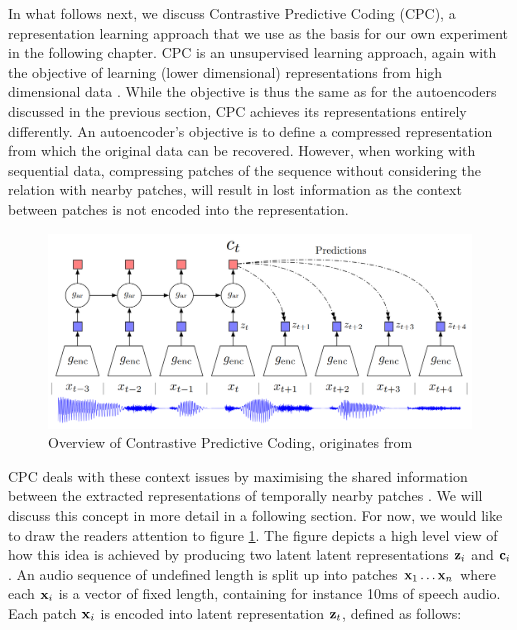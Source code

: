 	In what follows next, we discuss Contrastive Predictive Coding (CPC), a representation learning approach that we use as the basis for our own experiment in the following chapter.
	CPC is an unsupervised learning approach, again with the objective of learning (lower dimensional) representations from high dimensional data \cite{oordRepresentationLearningContrastive2019}. While the objective is thus the same as for the autoencoders discussed in the previous section, CPC achieves its representations entirely differently. An autoencoder's objective is to define a compressed representation from which the original data can be recovered. However, when working with sequential data, compressing patches of the sequence without considering the relation with nearby patches, will result in lost information as the context between patches is not encoded into the representation. %


\begin{figure}[h] %
	\centering
	\includegraphics[width=0.7\linewidth]{"cpc overview"}
	\caption{Overview of Contrastive Predictive Coding, originates from \cite{oordRepresentationLearningContrastive2019}}
	\label{fig:cpc-overview}
\end{figure}

	CPC deals with these context issues by maximising the shared information between the extracted representations of temporally nearby patches \cite{lowePuttingEndEndtoEnd2020}. We will discuss this concept in more detail in a following section. For now, we would like to draw the readers attention to figure \ref{fig:cpc-overview}. The figure depicts a high level view of how this idea is achieved by producing two latent latent representations $\mathbf{z}_i$ and $\mathbf{c}_i$. An audio sequence of undefined length is split up into patches $\mathbf{x}_1 \dots \mathbf{x}_n$ where each $\mathbf{x}_i$ is a vector of fixed length, containing for instance 10ms of speech audio. Each patch $\mathbf{x}_i$ is encoded into latent representation $\mathbf{z}_t$, defined as follows:
	
